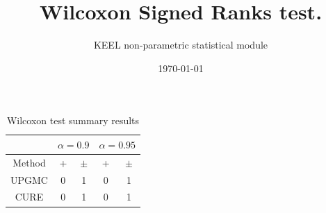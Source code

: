 \documentclass[a4paper,10pt]{article}
\title{Wilcoxon Signed Ranks test.}
\date{\today}
\author{KEEL non-parametric statistical module}
\begin{document}
\pagestyle{empty}
\maketitle
\thispagestyle{empty}


\begin{table}
\centering\scriptsize
{}
\caption{Ranks computed by the Wilcoxon test}

\end{table}

 \clearpage 


\begin{table}
\centering\scriptsize
{}
\caption{Summary of the Wilcoxon test. \textbullet = the method in the row improves the method of the column. \textopenbullet = the method in the column improves the method of the row. Upper diagonal of level significance $\alpha=0.9$,Lower diagonal level of significance $\alpha=0.95$}

\end{table}

 \clearpage 


\begin{table}[!htp]
\centering\scriptsize
\begin{tabular}{
|c|c|c|c|c|}
\hline
&\multicolumn{2}{c|}{$\alpha=0.9$} & \multicolumn{2}{c|}{$\alpha=0.95$}\\\hline
Method & + & $\pm$ & + & $\pm$ \\
\hline
UPGMC & 0 & 1 & 0 & 1\\
\hline
CURE & 0 & 1 & 0 & 1\\
\hline

\end{tabular}
\caption{Wilcoxon test summary results}

\end{table}

 \clearpage 
\end{document}
